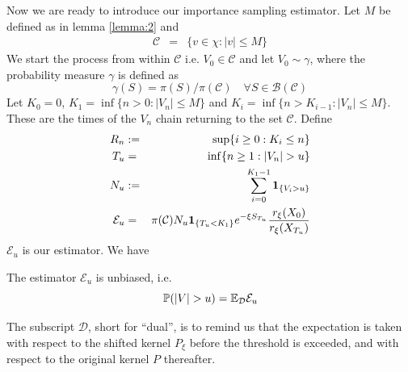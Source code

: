 \documentclass[aoas,preprint]{imsart}
\numberwithin{equation}{section}
\theoremstyle{plain}
\begin{document}
Now we are ready to introduce our importance sampling estimator.
Let $M$ be defined as in lemma \ref{lemma:2} and
\begin{eqnarray*}
  \mathcal C &=& \{v \in \chi: |v| \leq M\}
\end{eqnarray*}
We start the process from within $\mathcal C$ i.e.
$V_0 \in \mathcal C$
and let $V_0 \sim \gamma$, where the probability
measure $\gamma$ is defined as
\[
\gamma(S) = \pi(S) / \pi(\mathcal C)
\quad \forall S \in \mathcal B(\mathcal C)
\]
Let $K_0 = 0$,
$K_1 = \inf\{n > 0: |V_n| \leq M\}$ and
$K_i = \inf\{n > K_{i-1}: |V_n| \leq M\}$.
These are the times of the $V_n$ chain returning to the set
$\mathcal C$. Define
\begin{eqnarray*}
  R_n &:=& \sup\{i \geq 0: K_i \leq n\} \\
  T_u &=& \inf\{n \geq 1: |V_n| > u\} \\
  N_u &:=& \sum_{i=0}^{K_1 - 1} \mathbf{1}_{\{V_i > u\}} \\
  \mathcal E_u &=& \pi(\mathcal C)
  N_u \mathbf{1}_{\{T_u < K_1\}} e^{-\xi S_{T_u}}
  {r_\xi(X_0) \over r_\xi(X_{T_u})}
\end{eqnarray*}
$\mathcal E_u$ is our estimator. We have
\begin{theorem}
  \label{thrm:consistency}
  The estimator $\mathcal E_u$ is unbiased, i.e.
  \begin{equation}
    \label{eq:fbf}
    \mathbb{P}(|V| > u) = \mathbb{E}_{\mathcal D} \mathcal E_u
  \end{equation}
\end{theorem}
The subscript $\mathcal D$, short for ``dual'', is to remind us
that the expectation is taken with respect to the shifted kernel
$P_\xi$ before the threshold is exceeded, and with respect to the
original kernel $P$ thereafter.
\end{document}
